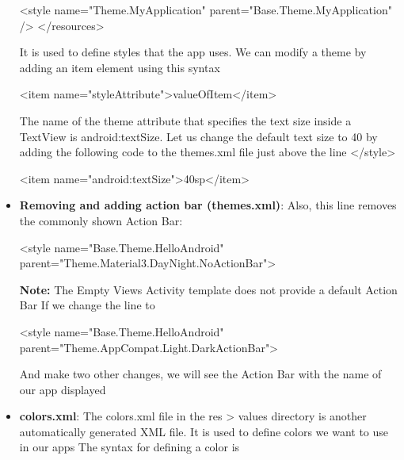 \documentclass{report}
\begin{document}
\begin{itemize}
\begin{xmlcode}
                 <style name="Theme.MyApplication" parent="Base.Theme.MyApplication" />
            </resources>
            \end{xmlcode}
            \bigbreak \noindent 
            It is used to define styles that the app uses.
            \bigbreak \noindent 
            We can modify a theme by adding an item element using this syntax
            \bigbreak \noindent 
            \begin{xmlcode}
            <item name="styleAttribute">valueOfItem</item>
            \end{xmlcode}
            \bigbreak \noindent 
            The name of the theme attribute that specifies the text size inside a TextView is android:textSize.
            \bigbreak \noindent 
            Let us change the default text size to 40 by adding the following code to the themes.xml file just above the line </style>
            \bigbreak \noindent 
            \begin{xmlcode}
            <item name="android:textSize">40sp</item>
            \end{xmlcode}
        \item \textbf{Removing and adding action bar (themes.xml)}: Also, this line removes the commonly shown Action Bar:
            \bigbreak \noindent 
            \begin{xmlcode}
            <style name="Base.Theme.HelloAndroid" parent="Theme.Material3.DayNight.NoActionBar">
            \end{xmlcode}
            \bigbreak \noindent 
            \textbf{Note:} The Empty Views Activity template does not provide a default Action Bar
            \bigbreak \noindent 
            If we change the line to
            \bigbreak \noindent 
            \begin{xmlcode}
            <style name="Base.Theme.HelloAndroid" parent="Theme.AppCompat.Light.DarkActionBar">
            \end{xmlcode}
            \bigbreak \noindent 
            And make two other changes, we will see the Action Bar with the name of our app displayed
        \item \textbf{colors.xml}: The colors.xml file in the res > values directory is another automatically generated XML file.
            \bigbreak \noindent 
            It is used to define colors we want to use in our apps
            \bigbreak \noindent 
            The syntax for defining a color is
            \bigbreak \noindent 
            \begin{xmlcode}

\end{xmlcode}
\end{itemize}
\end{document}

